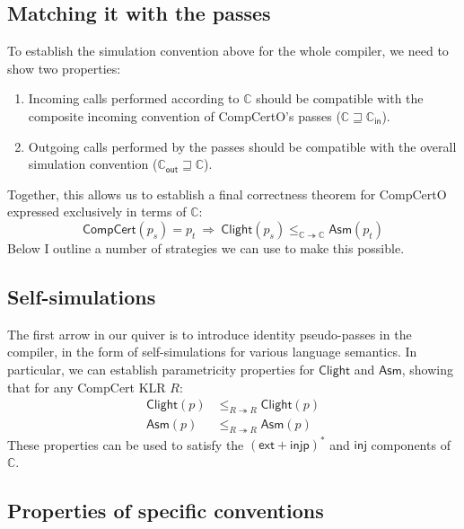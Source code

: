\documentclass[11pt]{article}
\begin{document}
\subsection{Matching it with the passes}

To establish the simulation convention above
for the whole compiler,
we need to show two properties:
\begin{enumerate}
  \item Incoming calls performed according to $\mathbb{C}$
    should be compatible with the composite incoming convention
    of CompCertO's passes ($\mathbb{C} \sqsupseteq \mathbb{C}_\mathsf{in}$).
  \item Outgoing calls performed by the passes
    should be compatible with the overall simulation convention
    ($\mathbb{C}_\mathsf{out} \sqsupseteq \mathbb{C}$).
\end{enumerate}
Together, this allows us to establish a final correctness theorem for CompCertO
expressed exclusively in terms of $\mathbb{C}$:
\[
  \mathsf{CompCert}(p_s) = p_t
  \: \Rightarrow \:
  \mathsf{Clight}(p_s)
  \le_{\mathbb{C} \twoheadrightarrow \mathbb{C}}
  \mathsf{Asm}(p_t)
\]
Below I outline a number of strategies
we can use to make this possible.

\subsection{Self-simulations}

The first arrow in our quiver
is to introduce identity pseudo-passes
in the compiler,
in the form of self-simulations for various language semantics.
In particular,
we can establish parametricity properties
for $\mathsf{Clight}$ and $\mathsf{Asm}$,
showing that for any CompCert KLR $R$:
\begin{align*}
  \mathsf{Clight}(p) &\le_{R \twoheadrightarrow R} \mathsf{Clight}(p) \\
  \mathsf{Asm}(p) &\le_{R \twoheadrightarrow R} \mathsf{Asm}(p)
\end{align*}
These properties can be used to satisfy
the $(\mathsf{ext} + \mathsf{injp})^*$ and $\mathsf{inj}$
components of $\mathbb{C}$.

\subsection{Properties of specific conventions}
\end{document}
